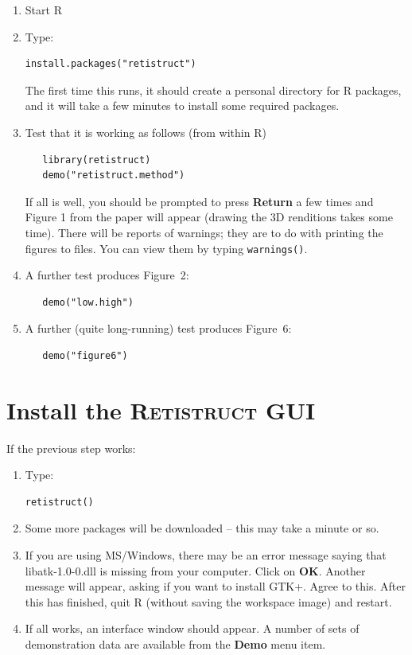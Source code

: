 \documentclass{book}
\begin{document}
\begin{enumerate}
\item Start \textsc{R}
 \item  Type:
\begin{verbatim}
install.packages("retistruct")
\end{verbatim}
   The first time this runs, it should create a personal directory for
   R packages, and it will take a few minutes to install some required
   packages.
 \item Test that it is working as follows (from within R)
\begin{verbatim}
   library(retistruct)
   demo("retistruct.method")
\end{verbatim}
   If all is well, you should be prompted to press \textbf{Return} a
   few times and Figure 1 from the paper \cite{SterrattEtal2012} will
   appear (drawing the 3D renditions takes some time). There will be
   reports of warnings; they are to do with printing the figures to
   files. You can view them by typing \texttt{warnings()}.
 \item A further test produces Figure~2:
\begin{verbatim}
   demo("low.high")
\end{verbatim}
 \item A further (quite long-running) test produces Figure~6:
\begin{verbatim}
   demo("figure6")
\end{verbatim}
\end{enumerate}

\section{Install the \textsc{Retistruct} GUI}
\label{retistruct-manual:sec:inst-retistr-gui}

If the previous step works:
\begin{enumerate}
\item Type:
\begin{verbatim}
retistruct()
\end{verbatim}
\item Some more packages will be downloaded -- this may take a
  minute or so.
\item If you are using MS/Windows, there may be an error message
  saying that libatk-1.0-0.dll is missing from your computer. Click on
  \textbf{OK}. Another message will appear, asking if you want to
  install GTK+. Agree to this.  After this has finished, quit R
  (without saving the workspace image) and restart.
\item If all works, an interface window should appear. A number of
  sets of demonstration data are available from the \textbf{Demo} menu item.
\end{enumerate}
\end{document}

